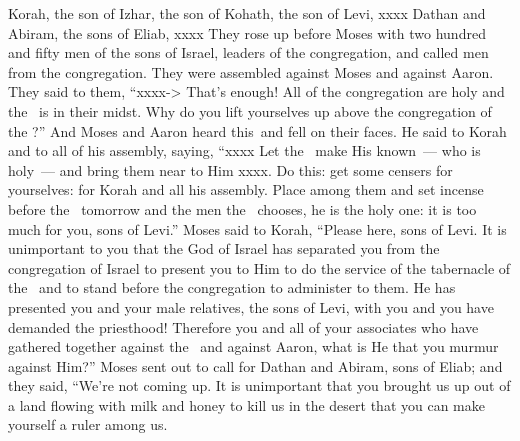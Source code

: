 
\begin{inparaenum}
   Korah, the son of Izhar, the son of Kohath, the son of Levi, xxxx Dathan and Abiram, the sons of Eliab, xxxx%
   They rose up before Moses with two hundred and fifty men of the sons of Israel, leaders of the congregation, and called men from the congregation.%
   They were assembled against Moses and against Aaron. They said to them, ``xxxx-> That's enough! All of the congregation are holy and the \lord\ is in their midst. Why do you lift yourselves up above the congregation of the \lord?''%
   And Moses and Aaron heard this\understood{}\ and fell on their faces.%
   He said to Korah and to all of his assembly, saying, ``xxxx Let the \lord\ make His known~--- who is holy~--- and bring them near to Him xxxx.%
   Do this: get some censers for yourselves: for Korah and all his assembly.%
   Place among them and set incense before the \lord\ tomorrow and the men the \lord\ chooses, he is the holy one: it is too much for you, sons of Levi.''%
   Moses said to Korah, ``Please here, sons of Levi.%
   It is unimportant to you that the God of Israel has separated you from the congregation of Israel to present you to Him to do the service of the tabernacle of the \lord\ and to stand before the congregation to administer to them.%
   He has presented you and your male relatives, the sons of Levi, with you and you have demanded the priesthood!%
   Therefore you and all of your associates who have gathered together against the \lord\ and against Aaron, what is He that you murmur against Him?''%
   Moses sent out to call for Dathan and Abiram, sons of Eliab; and they said, ``We're not coming up.%
   It is unimportant that you brought us up out of a land flowing with milk and honey to kill us in the desert that you can make yourself a ruler among us.%

\end{inparaenum}
